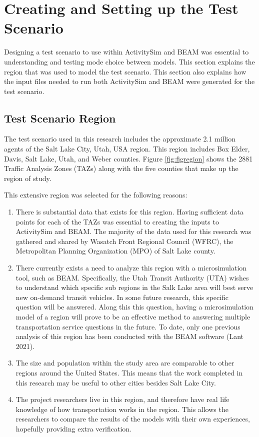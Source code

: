 \documentclass[12pt, oneside, openright]{byuthesis}
\providecommand{\tightlist}{%
  \setlength{\itemsep}{0pt}\setlength{\parskip}{0pt}}
\begin{document}
\hypertarget{mscen}{%
\section{Creating and Setting up the Test Scenario}\label{mscen}}

Designing a test scenario to use within ActivitySim and BEAM was essential to understanding and testing mode choice between models. This section explains the region that was used to model the test scenario. This section also explains how the input files needed to run both ActivitySim and BEAM were generated for the test scenario.

\hypertarget{test-scenario-region}{%
\subsection{Test Scenario Region}\label{test-scenario-region}}

The test scenario used in this research includes the approximate 2.1 million agents of the Salt Lake City, Utah, USA region. This region includes Box Elder, Davis, Salt Lake, Utah, and Weber counties. Figure \ref{fig:figregion} shows the 2881 Traffic Analysis Zones (TAZs) along with the five counties that make up the region of study.

This extensive region was selected for the following reasons:

\begin{enumerate}
\def\labelenumi{\arabic{enumi}.}
\tightlist
\item
  There is substantial data that exists for this region. Having sufficient data points for each of the TAZs was essential to creating the inputs to ActivitySim and BEAM. The majority of the data used for this research was gathered and shared by Wasatch Front Regional Council (WFRC), the Metropolitan Planning Organization (MPO) of Salt Lake county.
\item
  There currently exists a need to analyze this region with a microsimulation tool, such as BEAM. Specifically, the Utah Transit Authority (UTA) wishes to understand which specific sub regions in the Salk Lake area will best serve new on-demand transit vehicles. In some future research, this specific question will be answered. Along this this question, having a microsimulation model of a region will prove to be an effective method to answering multiple transportation service questions in the future. To date, only one previous analysis of this region has been conducted with the BEAM software (Lant 2021).
\item
  The size and population within the study area are comparable to other regions around the United States. This means that the work completed in this research may be useful to other cities besides Salt Lake City.
\item
  The project researchers live in this region, and therefore have real life knowledge of how transportation works in the region. This allows the researchers to compare the results of the models with their own experiences, hopefully providing extra verification.
\end{enumerate}
\end{document}
